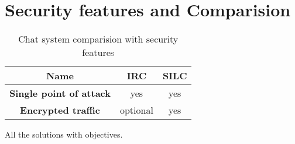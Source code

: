 \section{Security features and Comparision}

\begin{longtable}{|c|c|c|}
\caption{Chat system comparision with security features}\\
\hline
\textbf{Name} & \textbf{IRC} & \textbf{SILC}\\
\hline
\textbf{Single point of attack} & yes & yes\\
\hline
\textbf{Encrypted traffic} & optional & yes\\
\hline
\end{longtable}

All the solutions with objectives.
